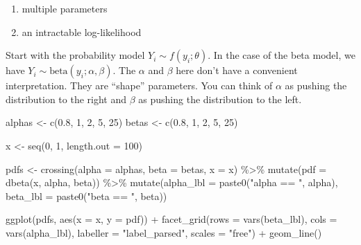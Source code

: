 \documentclass[
]{book}
\newenvironment{Shaded}{\begin{snugshade}}{\end{snugshade}}
\newcommand{\AttributeTok}[1]{\textcolor[rgb]{0.77,0.63,0.00}{#1}}
\newcommand{\DecValTok}[1]{\textcolor[rgb]{0.00,0.00,0.81}{#1}}
\newcommand{\FloatTok}[1]{\textcolor[rgb]{0.00,0.00,0.81}{#1}}
\newcommand{\FunctionTok}[1]{\textcolor[rgb]{0.00,0.00,0.00}{#1}}
\newcommand{\NormalTok}[1]{#1}
\newcommand{\OtherTok}[1]{\textcolor[rgb]{0.56,0.35,0.01}{#1}}
\newcommand{\SpecialCharTok}[1]{\textcolor[rgb]{0.00,0.00,0.00}{#1}}
\newcommand{\StringTok}[1]{\textcolor[rgb]{0.31,0.60,0.02}{#1}}
\providecommand{\tightlist}{%
  \setlength{\itemsep}{0pt}\setlength{\parskip}{0pt}}
\begin{document}
\begin{enumerate}
\def\labelenumi{\arabic{enumi}.}
\tightlist
\item
  multiple parameters
\item
  an intractable log-likelihood
\end{enumerate}

Start with the probability model \(Y_i \sim f(y_i; \theta)\). In the case of the beta model, we have \(Y_i \sim \text{beta}(y_i; \alpha, \beta)\). The \(\alpha\) and \(\beta\) here don't have a convenient interpretation. They are ``shape'' parameters. You can think of \(\alpha\) as pushing the distribution to the right and \(\beta\) as pushing the distribution to the left.

\begin{Shaded}
\begin{Highlighting}[]
\NormalTok{alphas }\OtherTok{\textless{}{-}} \FunctionTok{c}\NormalTok{(}\FloatTok{0.8}\NormalTok{, }\DecValTok{1}\NormalTok{, }\DecValTok{2}\NormalTok{, }\DecValTok{5}\NormalTok{, }\DecValTok{25}\NormalTok{)}
\NormalTok{betas }\OtherTok{\textless{}{-}} \FunctionTok{c}\NormalTok{(}\FloatTok{0.8}\NormalTok{, }\DecValTok{1}\NormalTok{, }\DecValTok{2}\NormalTok{, }\DecValTok{5}\NormalTok{, }\DecValTok{25}\NormalTok{)}

\NormalTok{x }\OtherTok{\textless{}{-}} \FunctionTok{seq}\NormalTok{(}\DecValTok{0}\NormalTok{, }\DecValTok{1}\NormalTok{, }\AttributeTok{length.out =} \DecValTok{100}\NormalTok{)}

\NormalTok{pdfs }\OtherTok{\textless{}{-}} \FunctionTok{crossing}\NormalTok{(}\AttributeTok{alpha =}\NormalTok{ alphas, }
                 \AttributeTok{beta =}\NormalTok{ betas, }
                 \AttributeTok{x =}\NormalTok{ x) }\SpecialCharTok{\%\textgreater{}\%}
  \FunctionTok{mutate}\NormalTok{(}\AttributeTok{pdf =} \FunctionTok{dbeta}\NormalTok{(x, alpha, beta)) }\SpecialCharTok{\%\textgreater{}\%}
  \FunctionTok{mutate}\NormalTok{(}\AttributeTok{alpha\_lbl =} \FunctionTok{paste0}\NormalTok{(}\StringTok{"alpha == "}\NormalTok{, alpha),}
         \AttributeTok{beta\_lbl =} \FunctionTok{paste0}\NormalTok{(}\StringTok{"beta == "}\NormalTok{, beta)) }

\FunctionTok{ggplot}\NormalTok{(pdfs, }\FunctionTok{aes}\NormalTok{(}\AttributeTok{x =}\NormalTok{ x, }\AttributeTok{y =}\NormalTok{ pdf)) }\SpecialCharTok{+} 
  \FunctionTok{facet\_grid}\NormalTok{(}\AttributeTok{rows =} \FunctionTok{vars}\NormalTok{(beta\_lbl), }\AttributeTok{cols =} \FunctionTok{vars}\NormalTok{(alpha\_lbl), }
             \AttributeTok{labeller =} \StringTok{"label\_parsed"}\NormalTok{, }\AttributeTok{scales =} \StringTok{"free"}\NormalTok{) }\SpecialCharTok{+} 
  \FunctionTok{geom\_line}\NormalTok{()}
\end{Highlighting}
\end{Shaded}
\end{document}
